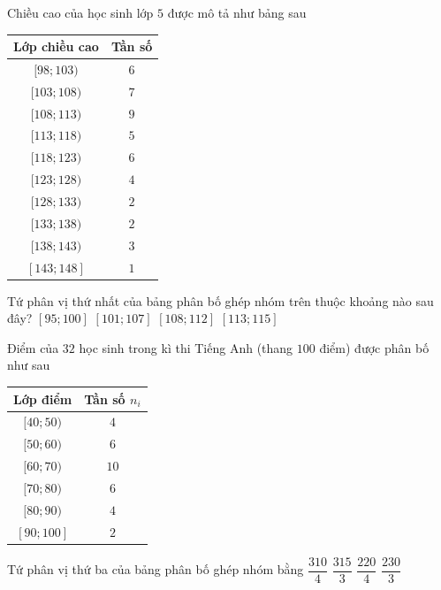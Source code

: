 

\begin{ex}%
	Chiều  cao của học sinh lớp $5$ được mô tả như bảng sau
	\begin{center}
		\begin{tabular}{|c|c|}
			\hline 
			Lớp  chiều cao & Tần số \\
			 \hline
			$[98; 103)$ &  $6$ \\
			\hline 
			$[103; 108)$  & $7$ \\
			\hline 
			$[108; 113)$  & $9$ \\
			\hline 
			$[113; 118)$ &  $5$ \\
			\hline 
			$[118; 123)$ &  $6$ \\
			\hline 
			$[123;  128)$ & $4$ \\
			\hline 
			$[128; 133)$ &  $2$ \\
			\hline 
			$[133; 138)$  & $2$ \\
			 \hline
			$[138;  143)$ & $3$ \\
			 \hline
			$[143;  148]$ & $1$ \\
			 \hline
		\end{tabular}
	\end{center}
	Tứ phân vị thứ nhất của bảng phân bố ghép nhóm trên thuộc khoảng nào sau đây? 
	 \choice
		{$[95; 100]$} 
		{\True $[101;  107]$}
		{$[108;  112]$}
		{$[113;115]$} 
\end{ex}

\begin{ex}%
	Điểm của $32$ học sinh trong kì thi Tiếng Anh (thang $100$  điểm) được phân bố như sau
	\begin{center}
		\begin{tabular}{|c|c|}
			 \hline
			 Lớp điểm & Tần số $n_{i}$ \\
			\hline 
			$[40;  50)$ & $4$ \\
			 \hline
			$[50;  60)$ & $6$ \\
			\hline 
			$[60; 70)$  & $10$ \\
			\hline 
			$[70; 80)$ & $6$  \\
			\hline 
			$[80; 90)$ & $4$  \\
			\hline 
			$[90;  100]$ & $2$ \\
			 \hline
		\end{tabular}
	\end{center}
	Tứ phân vị  thứ ba của bảng phân bố ghép nhóm bằng
	 \choice
		{$\dfrac{310}{4}$} 
		{$\dfrac{315}{3}$} 
		{$\dfrac{220}{4}$} 
		{\True $\dfrac{230}{3}$} 
\end{ex}

